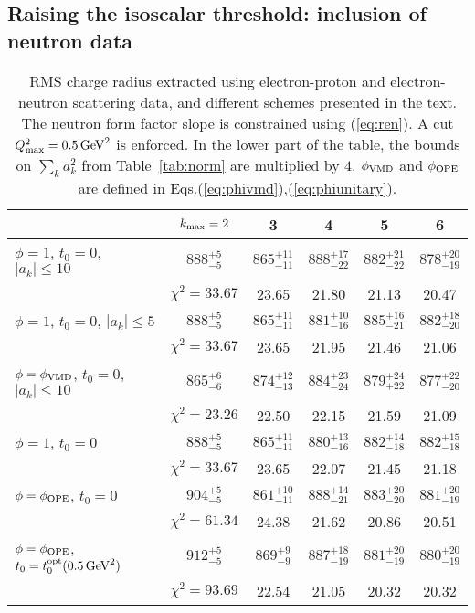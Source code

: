 \documentclass[12pt]{article}
\begin{document}
\subsection{Raising the isoscalar threshold: inclusion of neutron data \label{sec:neutron}}

\begin{table}
\begin{center}
\begin{tabular}{l|ccccc}
& $k_{\rm max}=2$ & 3 & 4 & 5 & 6
\\
\hline
$\phi=1$, $t_0=0$, $|a_k|\le 10$ & $888^{+5}_{-5}$ & $865^{+11}_{-11}$ & $888^{+17}_{-22}$ & $882^{+21}_{-22}$ & $878^{+20}_{-19}$ 
\\
& $\chi^2=33.67$ & 23.65 & 21.80 & 21.13 & 20.47 
\\
$\phi=1$, $t_0=0$, $|a_k|\le 5$ & $888^{+5}_{-5}$ & $865^{+11}_{-11}$ & $881^{+10}_{-16}$ & $885^{+16}_{-21}$ & $882^{+18}_{-20}$
\\
& $\chi^2=33.67$ & 23.65 & 21.95 & 21.46 & 21.06 
\\
$\phi=\phi_{\rm VMD}$, $t_0=0$,  $|a_k|\le 10$ & $865^{+6}_{-6}$ & $874^{+12}_{-13}$ & $884^{+23}_{-24}$ & $879^{+24}_{+22}$ & $877^{+22}_{-20}$ 
\\
& $\chi^2=23.26$ & 22.50 & 22.15 & 21.59 & 21.09 
\\
\hline
$\phi=1$, $t_0=0$ & $888^{+5}_{-5}$ & $865^{+11}_{-11}$ & $880^{+13}_{-16}$ & $882^{+14}_{-18}$ & $882^{+15}_{-18}$
\\
& $\chi^2=33.67$ & 23.65 & 22.07 & 21.45 & 21.18
\\
$\phi=\phi_{\rm OPE}$, $t_0=0$ & $904^{+5}_{-5}$ & $861^{+10}_{-11}$ & $888^{+14}_{-21}$ & $883^{+20}_{-20}$
& $881^{+20}_{-19}$ 
\\
& $\chi^2=61.34$ & 24.38 & 21.62 & 20.86 & 20.51
\\
$\phi=\phi_{\rm OPE}$, $t_0=t_0^{\rm opt}(0.5\,{\rm GeV}^2)$ & 
$912^{+5}_{-5}$ & $869^{+9}_{-9}$ & $887^{+18}_{-19}$ & $881^{+20}_{-19}$ & $880^{+20}_{-19}$ 
\\
& $\chi^2=93.69$ & 22.54 & 21.05 & 20.32 & 20.32
\end{tabular} 
\end{center}
\caption{
RMS charge radius extracted using electron-proton and electron-neutron 
scattering data, and different schemes presented in the text.   The neutron 
form factor slope is constrained using (\ref{eq:ren}).   
A cut $Q^2_{\rm max}=0.5\,{\rm GeV}^2$ is enforced.   
In the lower part of the table, 
the bounds on $\sum_k a_k^2$ from Table~\ref{tab:norm} are multiplied by $4$. 
$\phi_{\rm VMD}$ and $\phi_{\rm OPE}$  
are defined in Eqs.(\ref{eq:phivmd}),(\ref{eq:phiunitary}).
\label{tab:schemes}
} 
\end{table}
\end{document}
